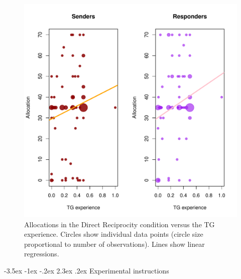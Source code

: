 \documentclass[12pt,a4paper]{article}\usepackage[]{graphicx}\usepackage[]{color}
\makeatletter
\def\maxwidth{ %
  \ifdim\Gin@nat@width>\linewidth
    \linewidth
  \else
    \Gin@nat@width
  \fi
}
\newenvironment{knitrout}{}{} %
\renewcommand\section{\@startsection {section}{1}{\z@}%
{-3.5ex \@plus -1ex \@minus -.2ex}%
{2.3ex \@plus.2ex}%
{\bf\sffamily\Large}}
\makeatother
\begin{document}
\begin{knitrout}
\color{fgcolor}\begin{figure}[!h]
\includegraphics[width=\maxwidth]{figure/plots_dr-1} \caption[Allocations in the Direct Reciprocity condition versus the TG experience]{Allocations in the Direct Reciprocity condition versus the TG experience. Circles show individual data points (circle size proportional to number of observations). Lines show linear regressions.}\label{fig:plots_dr}
\end{figure}


\end{knitrout}

\newpage
\section{Experimental instructions}


\end{document}
